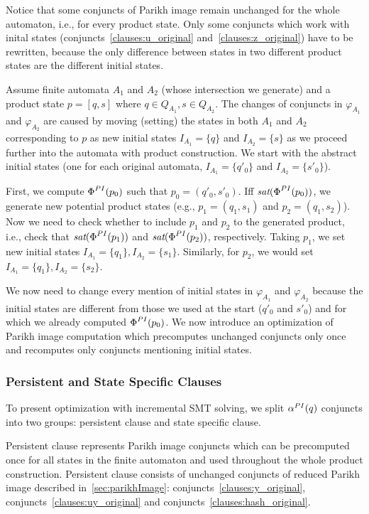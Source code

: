 Notice that some conjuncts of Parikh image remain unchanged for the whole automaton, i.e., for every product state. Only some conjuncts which work with inital states (conjuncts~\ref{clauses:u_original} and~\ref{clauses:z_original}) have to be rewritten, because the only difference between states in two different product states are the different initial states.

Assume finite automata $A_1$ and $A_2$ (whose intersection we generate) and a product state $p = [q, s]$ where $q \in Q_{A_1}, s \in Q_{A_2}$. The changes of conjuncts in $\varphi_{A_1}$ and $\varphi_{A_2}$ are caused by moving (setting) the states in both $A_1$ and $A_2$ corresponding to $p$ as new initial states $I_{A_1} = \{q\}$ and $I_{A_2} = \{s\}$ as we proceed further into the automata with product construction. We start with the abstract initial states (one for each original automata, $I_{A_1} = \{q'_0\}$ and $I_{A_2} = \{s'_0\}$).

First, we compute $\emph{$\Phi$}^{PI}(p_0)$ such that $p_0 = (q'_0,s'_0)$. Iff $\emph{sat}(\emph{$\Phi$}^{PI}(p_0))$, we generate new potential product states (e.g., $p_1 = (q_1, s_1)$ and $p_2 = (q_1, s_2)$). Now we need to check whether to include $p_1$ and $p_2$ to the generated product, i.e., check that $\emph{sat}(\emph{$\Phi$}^{PI}(p_1))$ and $\emph{sat}(\emph{$\Phi$}^{PI}(p_2))$, respectively. Taking $p_1$, we set new initial states $I_{A_1} = \{q_1\}, I_{A_2} = \{s_1\}$. Similarly, for $p_2$, we would set $I_{A_1} = \{q_1\}, I_{A_2} = \{s_2\}$.

We now need to change every mention of initial states in $\varphi_{A_1}$ and $\varphi_{A_2}$ because the initial states are different from those we used at the start ($q'_0$ and $s'_0$) and for which we already computed $\emph{$\Phi$}^{PI}(p_0)$. We now introduce an optimization of Parikh image computation which precomputes unchanged conjuncts only once and recomputes only conjuncts mentioning initial states.

\subsubsection{Persistent and State Specific Clauses}

To present optimization with incremental SMT solving, we split $\alpha^{PI}(q)$ conjuncts into two groups: persistent clause and state specific clause.

Persistent clause represents Parikh image conjuncts which can be precomputed once for all states in the finite automaton and used throughout the whole product construction. Persistent clause consists of unchanged conjuncts of reduced Parikh image described in~\ref{sec:parikhImage}: conjuncts~\ref{clauses:y_original}, conjuncts~\ref{clauses:uy_original} and conjuncts~\ref{clauses:hash_original}.

